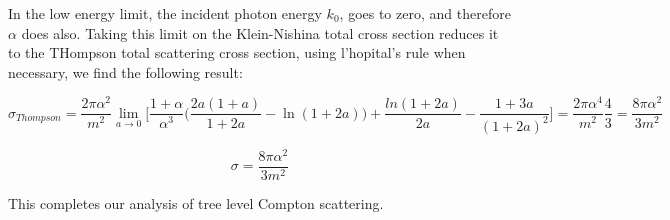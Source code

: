 \documentclass[a4]{article}
\begin{document}
    In the low energy limit, the incident photon energy $k_0$, goes to zero, and therefore $\alpha$ does also. Taking this limit on the Klein-Nishina total cross section reduces it to the THompson total scattering
    cross section, using l'hopital's rule when necessary, we find the following result:

    \begin{equation}
        \sigma_{Thompson} = \frac{2 \pi \alpha^2}{m^2} \lim_{a \rightarrow 0} \Big[ \frac{1 + \alpha}{\alpha^3} \big( \frac{2a (1 + a)}{1 + 2a} - \ln (1 + 2a) \big) + \frac{ln (1 + 2a)}{2a} - \frac{1 + 3a}{(1 + 2a)^2} \Big] = \frac{2 \pi \alpha^4}{m^2} \frac{4}{3} = \frac{8 \pi \alpha^2}{3 m^2}
    \end{equation}

    \begin{framed}
        \begin{equation}
            \sigma = \frac{8 \pi \alpha^2}{3 m^2}
        \end{equation}
    \end{framed}

    This completes our analysis of tree level Compton scattering.
\end{document}
